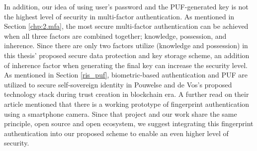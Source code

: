 In addition, our idea of using user's password and the PUF-generated key is not the highest level of security in multi-factor authentication. As mentioned in Section \ref{chp:2.mfa}, the most secure multi-factor authentication can be achieved when all three factors are combined together; knowledge, possession, and inherence. Since there are only two factors utilize (knowledge and possession) in this thesis' proposed secure data protection and key storage scheme, an addition of inherence factor when generating the final key can increase the security level. As mentioned in Section \ref{ris_puf}, biometric-based authentication and PUF are utilized to secure self-sovereign identity in Pouwelse and de Vos's proposed technology stack during trust creation in blockchain era. A further read on their article mentioned that there is a working prototype of fingerprint authentication using a smartphone camera. Since that project and our work share the same principle, open source and open ecosystem, we suggest integrating this fingerprint authentication into our proposed scheme to enable an even higher level of security.
